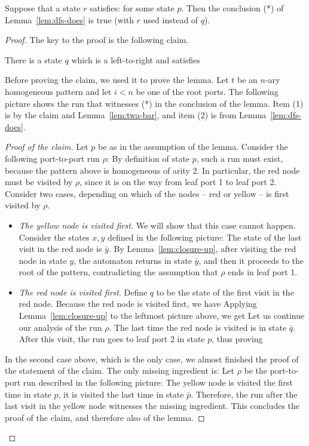 \begin{lemma}\label{lem:get-dfs}
Suppose that a state $r$ satisfies:
for some state $p$. 
Then the conclusion (*) of Lemma~\ref{lem:dfs-does} is true (with $r$ used instead of $q$).
\end{lemma}
\begin{proof}
The key to the proof is the following claim.
\begin{claim}
	There is a state $q$ which is a left-to-right \dfs and satisfies 
\end{claim}
Before proving the claim, we used it to prove the lemma. Let  $t$ be an $n$-ary homogeneous pattern and let $i < n$ be one of the root ports. The following picture shows the run that witnesses (*) in the conclusion of the lemma. 
Item (1) is by the claim and Lemma~\ref{lem:twa-bar}, and item (2) is from Lemma~\ref{lem:dfs-does}. 

\begin{proof}[Proof of the claim]
Let $p$ be as in the assumption of the lemma. Consider the following port-to-port  run $\rho$:
By definition of state $p$, such a run must exist, because the pattern above is homogeneous of arity 2.  
In particular,  the red node must be  visited by $\rho$, since it is on the way from leaf port 1 to leaf port 2.  Consider two cases, depending on which of the nodes -- red or yellow -- is first visited by $\rho$.

\begin{itemize}
	\item \emph{The yellow node is visited first.} We will show that this case cannot happen.   Consider the states $x,y$ defined in the following picture:
The state of the last visit in the red node is $\bar y$. By Lemma~\ref{lem:closure-up}, after visiting the red node in state $y$, the automaton returns in state $\bar y$, and then it proceeds to the root of the pattern, contradicting the assumption that $\rho$ ends in leaf port 1.  
	\item \emph{The red node is visited first}. Define $q$ to be the state of the first visit in the red node. Because the red node is visited first, we have 
	Applying Lemma~\ref{lem:closure-up} to the leftmost picture above, we get 
	Let us continue our analysis of the run $\rho$. The last time the red node is visited is in state $\bar q$. After this visit, the run goes to leaf port 2 in state $p$, thus proving 
\end{itemize}
In the second case above, which is the only case, we almost finished the proof of the statement of the claim. The only missing ingredient is:
Let $\rho$ be the port-to-port run described in the following picture:
The yellow node is visited the first time in state $p$, it is visited the last time in state $\bar p$. Therefore, the run after the last visit in the yellow node witnesses the missing ingredient. This concludes the proof of the claim, and therefore also of the lemma. \end{proof}
 \end{proof}
 
